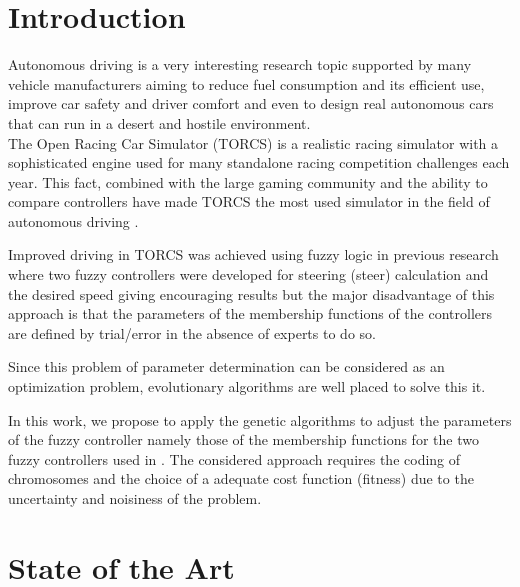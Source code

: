 \documentclass[runningheads,a4paper]{llncs}
\begin{document}
	\section{Introduction}
	\label{sec:intro}

Autonomous driving is a very interesting research topic supported by many vehicle manufacturers aiming to reduce fuel consumption and its efficient use, improve car safety and driver comfort and even to design real autonomous cars that can run in a desert and hostile environment. \\
The Open Racing Car Simulator (TORCS) is a realistic racing simulator with a sophisticated engine used for many standalone racing competition challenges each year. This fact, combined with the large gaming community and the ability to compare controllers have made TORCS the most used simulator in the field of autonomous driving \cite{manualTORCS}.

Improved driving in TORCS was achieved using fuzzy logic in previous research where two fuzzy controllers were developed for steering (steer) calculation and the desired speed giving encouraging results but the major disadvantage of this approach is that the parameters of the membership functions of the controllers are defined by trial/error in the absence of experts to do so.

Since this problem of parameter determination can be considered as an optimization problem, evolutionary algorithms are well placed to solve this it.

In this work, we propose to apply the genetic algorithms to adjust the parameters of the fuzzy controller namely those of the membership functions for the two fuzzy controllers used in \cite{evo17}.
The considered approach  requires the coding of chromosomes and the choice of a adequate cost function (fitness) due to the uncertainty and noisiness of the problem.



	\section{State of the Art}


	\label{sec:soa}
\end{document}
